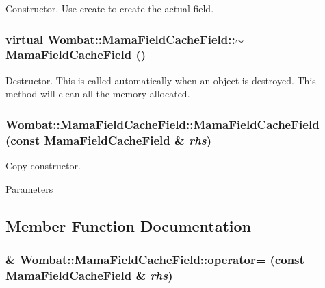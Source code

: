 Constructor. Use {\ttfamily create} to create the actual field. \hypertarget{classWombat_1_1MamaFieldCacheField_a959c4e16ec621a70d4cb917366b3ecda}{
\subsubsection[{$\sim$MamaFieldCacheField}]{\setlength{\rightskip}{0pt plus 5cm}virtual Wombat::MamaFieldCacheField::$\sim$MamaFieldCacheField ()}}
\label{classWombat_1_1MamaFieldCacheField_a959c4e16ec621a70d4cb917366b3ecda}


Destructor. This is called automatically when an object is destroyed. This method will clean all the memory allocated. \hypertarget{classWombat_1_1MamaFieldCacheField_afff140fb76e047923aa8479c8808a79a}{
\subsubsection[{MamaFieldCacheField}]{\setlength{\rightskip}{0pt plus 5cm}Wombat::MamaFieldCacheField::MamaFieldCacheField (const {\bf MamaFieldCacheField} \& {\em rhs})}}
\label{classWombat_1_1MamaFieldCacheField_afff140fb76e047923aa8479c8808a79a}


Copy constructor. 
\begin{DoxyParams}{Parameters}
\item[{\em }]\end{DoxyParams}


\subsection{Member Function Documentation}
\hypertarget{classWombat_1_1MamaFieldCacheField_a7241e2da84e4894c53821f21dcd80062}{
\subsubsection[{operator=}]{\& Wombat::MamaFieldCacheField::operator= (const {\bf MamaFieldCacheField} \& {\em rhs})}}
\label{classWombat_1_1MamaFieldCacheField_a7241e2da84e4894c53821f21dcd80062}


